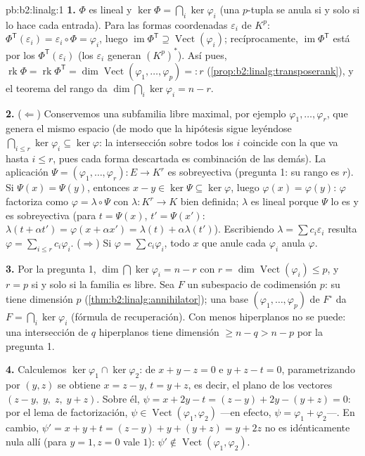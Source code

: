 \begin{solution}{pb:b2:linalg:1}
\textbf{1.} $\Phi$ es lineal y $\ker\Phi = \bigcap_i \ker\varphi_i$
(una $p$-tupla se anula si y solo si lo hace cada entrada). Para
las formas coordenadas $\varepsilon_i$ de $K^p$: $\Phi^{\mathsf
T}(\varepsilon_i) = \varepsilon_i \circ \Phi = \varphi_i$, luego
$\operatorname{im}\Phi^{\mathsf T} \supseteq
\operatorname{Vect}(\varphi_i)$; recíprocamente,
$\operatorname{im}\Phi^{\mathsf T}$ está  por los
$\Phi^{\mathsf T}(\varepsilon_i)$ (los $\varepsilon_i$ generan
$(K^p)^*$). Así pues, $\operatorname{rk}\Phi = \operatorname{rk}
\Phi^{\mathsf T} = \dim\operatorname{Vect}(\varphi_1, \dots,
\varphi_p) =: r$ (\cref{prop:b2:linalg:transposerank}), y el
teorema del rango da $\dim\bigcap_i\ker\varphi_i = n - r$.

\textbf{2.} ($\Leftarrow$) Conservemos una subfamilia libre
maximal, por ejemplo $\varphi_1, \dots, \varphi_r$, que genera el
mismo espacio (de modo que la hipótesis sigue leyéndose
$\bigcap_{i \leq r}\ker\varphi_i \subseteq \ker\varphi$: la
intersección sobre todos los $i$ coincide con la que va hasta $i
\leq r$, pues cada forma descartada es combinación de las demás).
La aplicación $\Psi = (\varphi_1, \dots, \varphi_r) \colon E \to
K^r$ es sobreyectiva (pregunta 1: su rango es $r$). Si $\Psi(x) =
\Psi(y)$, entonces $x - y \in \ker\Psi \subseteq \ker\varphi$,
luego $\varphi(x) = \varphi(y)$: $\varphi$ factoriza como $\varphi
= \lambda \circ \Psi$ con $\lambda \colon K^r \to K$ bien
definida; $\lambda$ es lineal porque $\Psi$ lo es y es
sobreyectiva (para $t = \Psi(x)$, $t' = \Psi(x')$: $\lambda(t +
\alpha t') = \varphi(x + \alpha x') = \lambda(t) +
\alpha\lambda(t')$). Escribiendo $\lambda = \sum c_i
\varepsilon_i$ resulta $\varphi = \sum_{i \leq r} c_i\varphi_i$.
($\Rightarrow$) Si $\varphi = \sum c_i \varphi_i$, todo $x$ que
anule cada $\varphi_i$ anula $\varphi$.

\textbf{3.} Por la pregunta 1, $\dim\bigcap\ker\varphi_i = n - r$
con $r = \dim\operatorname{Vect}(\varphi_i) \leq p$, y $r = p$ si
y solo si la familia es libre. Sea $F$ un subespacio de
codimensión $p$: su  tiene dimensión $p$
(\cref{thm:b2:linalg:annihilator}); una base $(\varphi_1, \dots,
\varphi_p)$ de $F^\circ$ da $F = \bigcap_i\ker\varphi_i$ (fórmula
de recuperación). Con menos hiperplanos no se puede: una
intersección de $q$ hiperplanos tiene dimensión $\geq n - q > n -
p$ por la pregunta 1.

\textbf{4.} Calculemos $\ker\varphi_1 \cap \ker\varphi_2$: de $x +
y - z = 0$ e $y + z - t = 0$, parametrizando por $(y, z)$ se
obtiene $x = z - y$, $t = y + z$, es decir, el plano de los
vectores $(z - y,\; y,\; z,\; y + z)$. Sobre él, $\psi = x + 2y -
t = (z - y) + 2y - (y + z) = 0$: por el lema de factorización,
$\psi \in \operatorname{Vect}(\varphi_1, \varphi_2)$ ---en efecto,
$\psi = \varphi_1 + \varphi_2$---. En cambio, $\psi' = x + y + t =
(z - y) + y + (y + z) = y + 2z$ no es idénticamente nula allí
(para $y = 1, z = 0$ vale $1$): $\psi' \notin
\operatorname{Vect}(\varphi_1, \varphi_2)$.


\end{solution}
